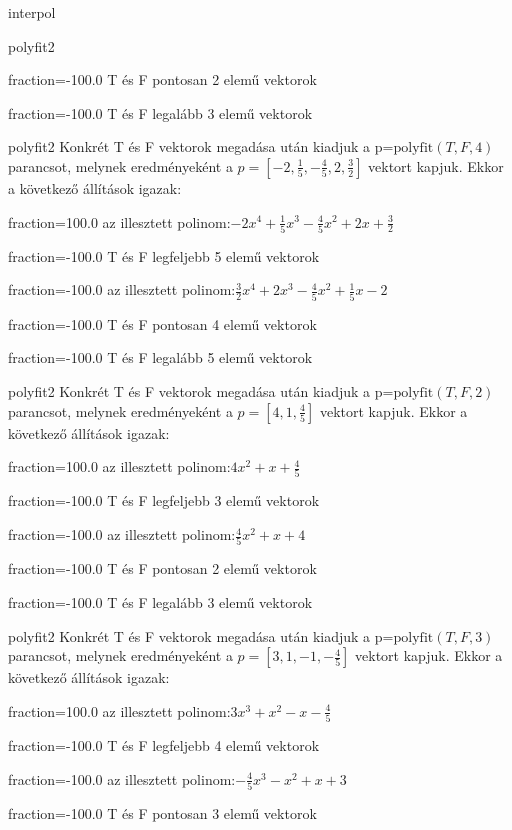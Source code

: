 \documentclass[12pt]{article}
\begin{document}
\begin{quiz}{interpol}
\begin{multi}[multiple]{polyfit2}
\item[fraction=-100.0]  T és F pontosan 2 elemű vektorok
\item[fraction=-100.0] T és F legalább 3 elemű vektorok
\end{multi}
\begin{multi}[multiple]{polyfit2}
Konkrét T és F vektorok megadása után kiadjuk a p=$\mathrm{polyfit}(T,F,4)$
parancsot, melynek eredményeként a $p=\left[-2,\frac{1}{5},-\frac{4}{5},2,\frac{3}{2}\right]$ vektort kapjuk.
Ekkor a következő állítások igazak:
\item[fraction=100.0] az illesztett polinom:$-2x^4+\frac{1}{5}x^3-\frac{4}{5}x^2+2x+\frac{3}{2}$
\item[fraction=-100.0]  T és F legfeljebb 5 elemű vektorok
\item[fraction=-100.0]  az illesztett polinom:$\frac{3}{2}x^4+2x^3-\frac{4}{5}x^2+\frac{1}{5}x-2$
\item[fraction=-100.0]  T és F pontosan 4 elemű vektorok
\item[fraction=-100.0] T és F legalább 5 elemű vektorok
\end{multi}
\begin{multi}[multiple]{polyfit2}
Konkrét T és F vektorok megadása után kiadjuk a p=$\mathrm{polyfit}(T,F,2)$
parancsot, melynek eredményeként a $p=\left[4,1,\frac{4}{5}\right]$ vektort kapjuk.
Ekkor a következő állítások igazak:
\item[fraction=100.0] az illesztett polinom:$4x^2+x+\frac{4}{5}$
\item[fraction=-100.0]  T és F legfeljebb 3 elemű vektorok
\item[fraction=-100.0]  az illesztett polinom:$\frac{4}{5}x^2+x+4$
\item[fraction=-100.0]  T és F pontosan 2 elemű vektorok
\item[fraction=-100.0] T és F legalább 3 elemű vektorok
\end{multi}
\begin{multi}[multiple]{polyfit2}
Konkrét T és F vektorok megadása után kiadjuk a p=$\mathrm{polyfit}(T,F,3)$
parancsot, melynek eredményeként a $p=\left[3,1,-1,-\frac{4}{5}\right]$ vektort kapjuk.
Ekkor a következő állítások igazak:
\item[fraction=100.0] az illesztett polinom:$3x^3+x^2-x-\frac{4}{5}$
\item[fraction=-100.0]  T és F legfeljebb 4 elemű vektorok
\item[fraction=-100.0]  az illesztett polinom:$-\frac{4}{5}x^3-x^2+x+3$
\item[fraction=-100.0]  T és F pontosan 3 elemű vektorok

\end{multi}
\end{quiz}
\end{document}
